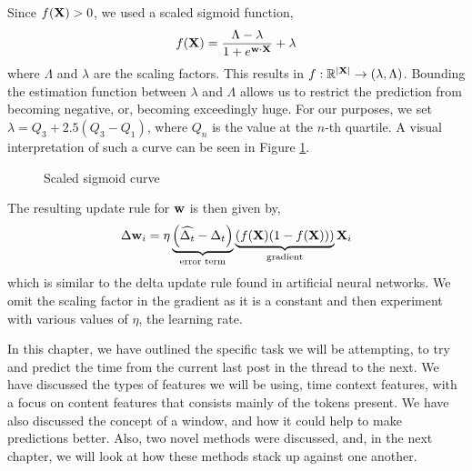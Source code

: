 Since $f(\mathbf{X}) > 0$, we used a scaled sigmoid function,
\[
	f(\mathbf{X}) = \frac{\Lambda-\lambda}{1 + e^{\mathbf{w} \cdot \mathbf{X}}} + \lambda
\]
where $\Lambda$ and $\lambda$ are the scaling factors. This results in $f: 
\mathbb{R}^{|\mathbf{X}|}  \rightarrow (\lambda,\Lambda)$. Bounding the estimation 
function between $\lambda$ and $\Lambda$ allows us to restrict the prediction 
from becoming negative, or, becoming exceedingly huge. For our purposes, we set 
$\lambda = Q_3 + 2.5(Q_{3} - Q_{1})$, where $Q_n$ is the value at the $n$-th 
quartile. A visual interpretation of such a curve can be seen in Figure 
\ref{fig:scaled_sigmoid}.
\begin{figure}
\begin{center}
\end{center}
\caption{Scaled sigmoid curve}\label{fig:scaled_sigmoid}
\end{figure}

The resulting update rule for $\mathbf{w}$ is then given by,
\[
	\Delta \mathbf{w}_i = \eta
				\underbrace{\left(\widehat{\Delta_t} - \Delta_t \right)}_{\text{error term}}
				\underbrace{\left( f(\mathbf{X})(1-f(\mathbf{X})) \right)}_{\text{gradient}}
						\mathbf{X}_i
\]
which is similar to the delta update rule found in artificial neural networks.  
We omit the scaling factor in the gradient as it is a constant and then 
experiment with various values of $\eta$, the learning rate. 

In this chapter, we have outlined the specific task we will be attempting, to 
try and predict the time from the current last post in the thread to the next.
We have discussed the types of features we will be using, time context features, 
with a focus on content features that consists mainly of the tokens present. We 
have also discussed the concept of a window, and how it could help to make 
predictions better. Also, two novel methods were discussed, and, in the next 
chapter, we will look at how these methods stack up against one another.

